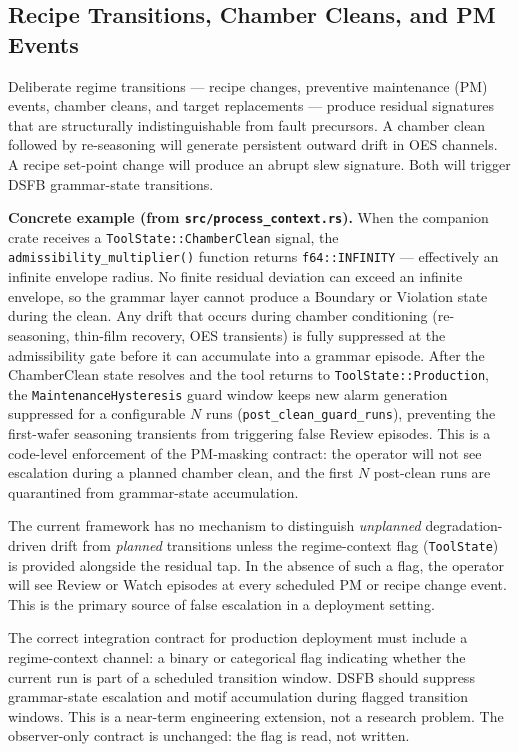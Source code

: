 \documentclass[11pt,letterpaper]{article}
\theoremstyle{scresult}
\begin{document}
\subsection{Recipe Transitions, Chamber Cleans, and PM Events}

Deliberate regime transitions --- recipe changes, preventive maintenance (PM)
events, chamber cleans, and target replacements --- produce residual signatures
that are structurally indistinguishable from fault precursors. A chamber clean
followed by re-seasoning will generate persistent outward drift in OES channels.
A recipe set-point change will produce an abrupt slew signature. Both will
trigger DSFB grammar-state transitions.

\textbf{Concrete example (from \texttt{src/process\_context.rs}).}
When the companion crate receives a \texttt{ToolState::ChamberClean} signal,
the \texttt{admissibility\_multiplier()} function returns \texttt{f64::INFINITY}
--- effectively an infinite envelope radius. No finite residual deviation can
exceed an infinite envelope, so the grammar layer cannot produce a Boundary or
Violation state during the clean. Any drift that occurs during chamber
conditioning (re-seasoning, thin-film recovery, OES transients) is fully
suppressed at the admissibility gate before it can accumulate into a grammar
episode. After the ChamberClean state resolves and the tool returns to
\texttt{ToolState::Production}, the \texttt{MaintenanceHysteresis} guard
window keeps new alarm generation suppressed for a configurable $N$ runs
(\texttt{post\_clean\_guard\_runs}), preventing the first-wafer seasoning
transients from triggering false Review episodes. This is a code-level
enforcement of the PM-masking contract: the operator will not see escalation
during a planned chamber clean, and the first $N$ post-clean runs are quarantined
from grammar-state accumulation.

The current framework has no mechanism to distinguish \emph{unplanned}
degradation-driven drift from \emph{planned} transitions unless the regime-context
flag (\texttt{ToolState}) is provided alongside the residual tap. In the absence
of such a flag, the operator will see Review or Watch episodes at every scheduled
PM or recipe change event. This is the primary source of false escalation in a
deployment setting.

The correct integration contract for production deployment must include a
regime-context channel: a binary or categorical flag indicating whether the
current run is part of a scheduled transition window. DSFB should suppress
grammar-state escalation and motif accumulation during flagged transition
windows. This is a near-term engineering extension, not a research problem.
The observer-only contract is unchanged: the flag is read, not written.
\end{document}
